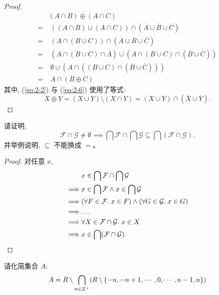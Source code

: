 \documentclass[a4paper, justified]{tufte-handout}
\begin{document}
\begin{proof}
  \setcounter{equation}{0}
  \begin{align}
    &(A \cap B) \oplus (A \cap C) \\
    =&\; ((A \cap B) \cup (A \cap C)) \cap (\overline{A} \cup \overline{B} \cup \overline{C})
      \label{eq:2-2} \\
    =&\; (A \cap (B \cup C)) \cap (\overline{A} \cup \overline{B} \cup \overline{C}) \\
    =&\; (A \cap (B \cup C) \cap \overline{A}) \cup (A \cap (B \cup C) \cap (\overline{B} \cup \overline{C})) \\
    =&\; \emptyset \cup (A \cap ((B \cup C) \cap (\overline{B} \cup \overline{C}))) \\
    =&\; A \cap (B \oplus C)
      \label{eq:2-6}
  \end{align}
  其中, (\ref{eq:2-2}) 与 (\ref{eq:2-6}) 使用了等式:
  \[
    X \oplus Y = (X \cup Y) \setminus (X \cap Y)
               = (X \cup Y) \cap (\overline{X} \cup \overline{Y}).
  \]
\end{proof}

\begin{problem}
  请证明,
  \[
    \mathcal{F} \cap \mathcal{G} \neq \emptyset \implies
      \bigcap \mathcal{F} \cap \bigcap \mathcal{G} \subseteq \bigcap (\mathcal{F} \cap \mathcal{G}).
  \]
  并举例说明, $\subseteq$ 不能换成 $=$。
\end{problem}

\begin{proof}
  对任意 $x$,
  \begin{align}
    &x \in \bigcap \mathcal{F} \cap \bigcap \mathcal{G} \\
    \implies& x \in \bigcap \mathcal{F} \land x \in \bigcap \mathcal{G} \\
    \implies& (\forall F \in \mathcal{F}.\; x \in F) \land (\forall G \in \mathcal{G}.\; x \in G) \\
    \implies& \textcolor{red}{\dots} \\
    \implies& \forall X \in \mathcal{F} \cap \mathcal{G}.\; x \in X \\
    \implies& x \in \bigcap (\mathcal{F} \cap \mathcal{G}).
  \end{align}
\end{proof}

\begin{problem}
  请化简集合 $A$:
  \[
    A = R \setminus \bigcap_{n \in Z^{+}}
      (R \setminus \{-n, -n+1, \cdots, 0, \cdots, n-1, n\})
  \]
\end{problem}
\end{document}
